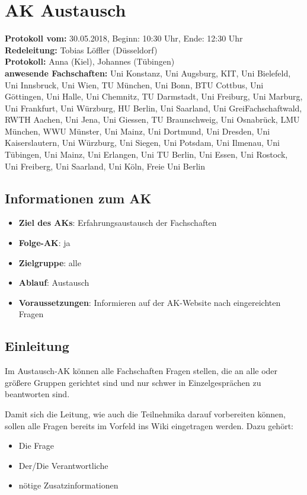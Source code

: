 
\section{AK Austausch}

  \textbf{Protokoll vom:} 30.05.2018,
  Beginn: 10:30 Uhr,
  Ende: 12:30 Uhr \\
  \textbf{Redeleitung:} Tobias Löffler (Düsseldorf) \\
  \textbf{Protokoll:} Anna (Kiel), Johannes (Tübingen) \\
  \textbf{anwesende Fachschaften:} Uni Konstanz, Uni Augsburg, KIT, Uni Bielefeld, Uni Innsbruck, Uni Wien, TU München, Uni Bonn, BTU Cottbus, Uni Göttingen, Uni Halle, Uni Chemnitz, TU Darmstadt, Uni Freiburg, Uni Marburg, Uni Frankfurt, Uni Würzburg, HU Berlin, Uni Saarland, Uni GreiFachschaftwald, RWTH Aachen, Uni Jena, Uni Giessen, TU Braunschweig, Uni Osnabrück, LMU München, WWU Münster, Uni Mainz, Uni Dortmund, Uni Dresden, Uni Kaiserslautern, Uni Würzburg, Uni Siegen, Uni Potsdam, Uni Ilmenau, Uni Tübingen, Uni Mainz, Uni Erlangen, Uni TU Berlin, Uni Essen, Uni Rostock, Uni Freiberg, Uni Saarland, Uni Köln, Freie Uni Berlin

  \subsection*{Informationen zum AK}
    \begin{itemize}
      \item \textbf{Ziel des AKs}: Erfahrungsaustausch der Fachschaften
      \item \textbf{Folge-AK}: ja
      \item \textbf{Zielgruppe}: alle
      \item \textbf{Ablauf}: Austausch
      \item \textbf{Voraussetzungen}: Informieren auf der AK-Website nach eingereichten Fragen
    \end{itemize}

  \subsection*{Einleitung}
    Im Austausch-AK können alle Fachschaften Fragen stellen, die an alle oder größere Gruppen gerichtet sind und nur schwer in Einzelgesprächen zu beantworten sind.

    Damit sich die Leitung, wie auch die Teilnehmika darauf vorbereiten können, sollen alle Fragen bereits im Vorfeld ins Wiki eingetragen werden.
    Dazu gehört:
    \begin{itemize}
      \item Die Frage
      \item Der/Die Verantwortliche
      \item nötige Zusatzinformationen
    \end{itemize}

